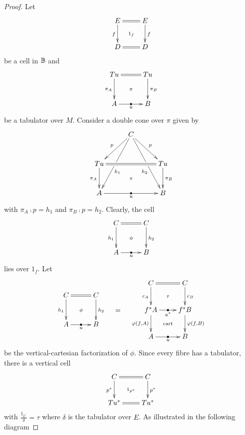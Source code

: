 \documentclass[9pt, leqno]{amsart}
\begin{document}
\begin{proof}
	Let 
	\begin{equation*}
		\xymatrix{
			E \ar@{=}[r]\ar[d]_{f} \ar@{}[dr]|{1_f} & E \ar[d]^{f} \\
			D \ar@{=}[r] & D
		}
	\end{equation*}
	be a cell in $\mathbb{B}$ and 
	\begin{equation*}
		\xymatrix@=1cm{
			Tu \ar@{=}[r] \ar[d]_{\pi_A} \ar@{}[dr]|{\pi} & Tu \ar[d]^{\pi_B} \\
			{A} \ar[r]|{\bullet}_u & {B}
		}
	\end{equation*}
	be a tabulator over $M$. Consider a double cone over $\pi$ given by 
	\begin{equation*}
		\xymatrix@=1cm{
			&C \ar[dl]_{p} \ar[ddl]|\hole^(.59){h_1} \ar[dr]^{p} \ar[ddr]|\hole_(.59){h_2}\\
			Tu \ar[d]_{\pi_A} \ar@{=}[rr] \ar@{}[drr]|{\pi} && Tu \ar[d]^{\pi_B} \\
			A \ar[rr]|{\bullet}_u && B
		}
	\end{equation*}
	with $\pi_A \comp p = h_1$ and $\pi_B \comp p = h_2$. Clearly, the cell
	\begin{equation*}
		\xymatrix@=1cm{
			C \ar@{=}[r] \ar[d]_{h_1} \ar@{}[dr]|{\phi} & C \ar[d]^{h_2} \\
			A \ar[r]|{\bullet}_u & B
		}
	\end{equation*}
	lies over $1_f$. Let
	\begin{equation*}
		\vcenter{\vbox{\xymatrix@=1cm{
					C \ar@{=}[r] \ar[d]_{h_1} \ar@{}[dr]|{\phi} & C \ar[d]^{h_2} \\
					A \ar[r]|{\bullet}_u & B
		}}} \quad = \quad 
		\vcenter{\vbox{\xymatrix{
					C \ar@{=}[r] \ar[d]_{c_A} \ar@{}[dr]|{\tau} & C \ar[d]^{c_B} \\
					f^*A \ar[d]_{\cleav{f}{A}} \ar[r]|{\bullet}_{u^*} \ar@{}[dr]|{\text{cart}} & f^*B \ar[d]^{\cleav{f}{B}} \\
					A \ar[r]|{\bullet}_{u} & B
		}}}
	\end{equation*}
	be the vertical-cartesian factorization of $\phi$. Since every fibre has a tabulator, there is a vertical cell
	\begin{equation*}
		\xymatrix{
			C \ar@{=}[r] \ar[d]_{p^*} \ar@{}[dr]|{1_{p^*}} & C \ar[d]^{p^*} \\
			Tu^* \ar@{=}[r] & Tu^*
		}
	\end{equation*}
	with $\frac{1_{k^*}}{\delta} = \tau$ where $\delta$ is the tabulator over $E$. As illustrated in the following diagram

\end{proof}
\end{document}
